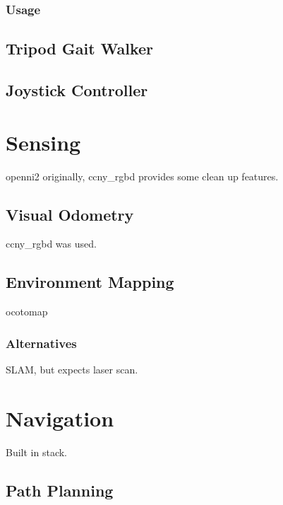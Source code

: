 \subsubsection{Usage}

\subsection{Tripod Gait Walker}
\subsection{Joystick Controller}


\section{Sensing}

openni2 originally, ccny\_rgbd \cite{ccny_rgbd} provides some clean up features.

\subsection{Visual Odometry}

ccny\_rgbd \cite{ccny_rgbd} was used.

\subsection{Environment Mapping}

ocotomap

\subsubsection{Alternatives}

SLAM, but expects laser scan.


\section{Navigation}

Built in stack.

\subsection{Path Planning}
